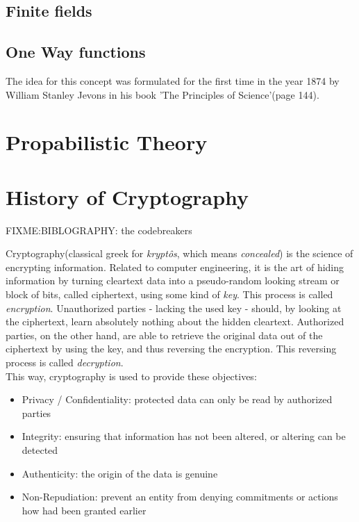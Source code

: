 \subsection{Finite fields}

\subsection{One Way functions}

The idea for this concept was formulated for the first time in the year 1874 by William Stanley Jevons in his book
'The Principles of Science'(page 144).

\section{Propabilistic Theory}

\section{History of Cryptography}
FIXME:BIBLOGRAPHY: the codebreakers

Cryptography(classical greek for \textit{krypt\^{o}s}, which means \textit{concealed})
is the science of encrypting information.
Related to computer engineering, it is the art of hiding information by turning cleartext
data into a 
pseudo-random looking stream or block of bits, called ciphertext, using some kind of
\textit{key}. This process is called \textit{encryption}.
Unauthorized parties - lacking the used key - should, by looking at the ciphertext, learn
absolutely nothing about the hidden cleartext. Authorized parties, on the other hand, are
able to retrieve the original data out of the ciphertext by using the key, and thus reversing
the encryption. This reversing process is called \textit{decryption}.
\\

This way, cryptography is used to provide these objectives:

\begin{itemize}
 \item Privacy / Confidentiality: protected data can only be read by authorized parties
 \item Integrity: ensuring that information has not been altered, or altering can be detected
 \item Authenticity: the origin of the data is genuine
 \item Non-Repudiation: prevent an entity from denying commitments or actions how had been 
 granted earlier
\end{itemize}

